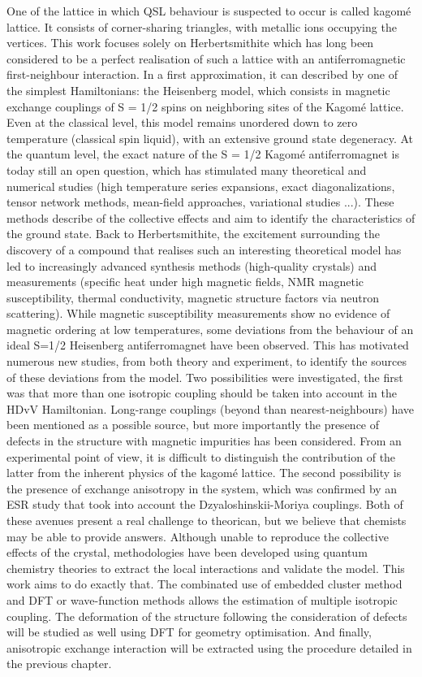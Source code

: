 \documentclass[12pt]{report}
\numberwithin{equation}{section}
\begin{document}
One of the lattice in which QSL behaviour is suspected to occur is called kagomé lattice. 
It consists of corner-sharing triangles, with metallic ions occupying the vertices.
This work focuses solely on Herbertsmithite which has long been considered to be a perfect realisation of such a lattice with an antiferromagnetic first-neighbour interaction.
In a first approximation, it can described by one of the simplest Hamiltonians: the Heisenberg model, which consists in magnetic exchange couplings of S = 1/2 spins on neighboring sites of the Kagomé lattice.
Even at the classical level, this model remains unordered down to zero temperature (classical spin liquid), with an extensive ground state degeneracy.
At the quantum level, the exact nature of the S = 1/2 Kagomé antiferromagnet is today still an open question, which has stimulated many theoretical and numerical studies (high
temperature series expansions, exact diagonalizations\cite{lauchli_sfrac12_2019}, tensor network methods\cite{he_signatures_2017,liao_gapless_2017}, mean-field approaches, variational studies \cite{iqbal_gapless_2013}...).
These methods describe of the collective effects and aim to identify the characteristics of the ground state.
Back to Herbertsmithite, the excitement surrounding the discovery of a compound that realises such an interesting theoretical model has led to increasingly advanced synthesis methods (high-quality crystals) and measurements (specific heat under high magnetic fields, NMR magnetic susceptibility, thermal conductivity, magnetic structure factors via neutron scattering).
While magnetic susceptibility measurements show no evidence of magnetic ordering at low temperatures, some deviations from the behaviour of an ideal S=1/2 Heisenberg antiferromagnet have been observed.
This has motivated numerous new studies, from both theory and experiment, to identify the sources of these deviations from the model.
Two possibilities were investigated, the first was that more than one isotropic coupling should be taken into account in the HDvV Hamiltonian.
Long-range couplings (beyond than nearest-neighbours) have been mentioned as a possible source, but more importantly the presence of defects in the structure with magnetic impurities has been considered.
From an experimental point of view, it is difficult to distinguish the contribution of the latter from the inherent physics of the kagomé lattice.
The second possibility is the presence of exchange anisotropy in the system, which was confirmed by an ESR study that took into account the Dzyaloshinskii-Moriya couplings.
Both of these avenues present a real challenge to theorican, but we believe that chemists may be able to provide answers.
Although unable to reproduce the collective effects of the crystal, methodologies have been developed using quantum chemistry theories to extract the local interactions and validate the model.
This work aims to do exactly that.
The combinated use of embedded cluster method and DFT or wave-function methods allows the estimation of multiple isotropic coupling.
The deformation of the structure following the consideration of defects will be studied as well using DFT for geometry optimisation.
And finally, anisotropic exchange interaction will be extracted using the procedure detailed in the previous chapter.
\end{document}

